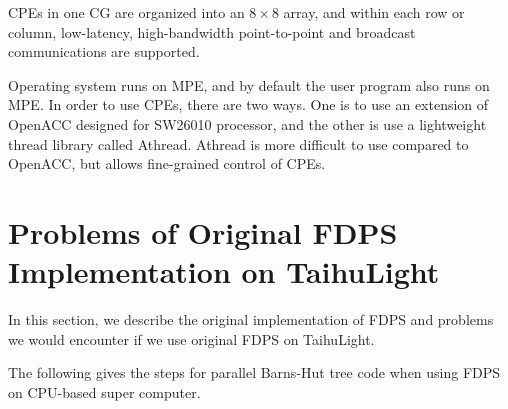 \documentclass[]{pasj01}
\begin{document}
CPEs in one CG are organized into an $8\times 8$ array, and within
each row or column, low-latency, high-bandwidth point-to-point and
broadcast communications are supported.

Operating system runs on MPE, and by default the user program also
runs on MPE. In order to use CPEs, there are two ways. One is to use
an extension of OpenACC designed for SW26010 processor, and the other
is use a lightweight thread library called Athread. Athread is more
difficult to use compared to OpenACC, but allows fine-grained control
of CPEs.

\section{Problems of Original FDPS Implementation on TaihuLight}
\label{sec:impl0}

In this section, we describe the original implementation of FDPS and
problems we would encounter if we use original FDPS on TaihuLight.

The following gives the steps for parallel Barns-Hut tree code when
using FDPS on CPU-based super computer.
\end{document}
